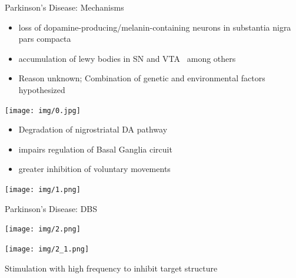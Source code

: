 \documentclass[10pt]{beamer}
\begin{document}
\begin{frame}{Parkinson's Disease: Mechanisms}
      \begin{itemize}
        \item loss of dopamine-producing/melanin-containing neurons in substantia nigra pars compacta~\autocite{mechanisms}
        \item accumulation of lewy bodies in SN and VTA~\autocite{syn} among others
        \item Reason unknown; Combination of genetic and environmental factors hypothesized~\autocite{pink, mechanisms}
      \end{itemize}
      \framebreak
    \begin{multicols}{2}
    \begin{minipage}{0.49\textwidth}
     \texttt{[image: img/0.jpg]}
    \end{minipage} \vfill \null
    \begin{minipage}{0.49\textwidth}
     \begin{itemize}
      \item Degradation of nigrostriatal DA pathway \\ [2em]
      \item impairs regulation of Basal Ganglia circuit \\ [2em]
      \item greater inhibition of voluntary movements \\ [2em]
     \end{itemize}
    \end{minipage}
    \end{multicols}


    \framebreak
    \begin{center}
    \texttt{[image: img/1.png]}
     \end{center}
     \end{frame}

 \begin{frame}{Parkinson's Disease: DBS~\autocite{ghara}}
  \begin{center}
   \texttt{[image: img/2.png]}
  \end{center}
  \framebreak
      \begin{multicols}{2}
    \begin{minipage}{0.49\textwidth}
      \texttt{[image: img/2\_1.png]}
         \end{minipage} \vfill \null
    \begin{minipage}{0.49\textwidth}
Stimulation with high frequency to inhibit target structure

    \end{minipage}
    \end{multicols}
\end{frame}
\end{document}
